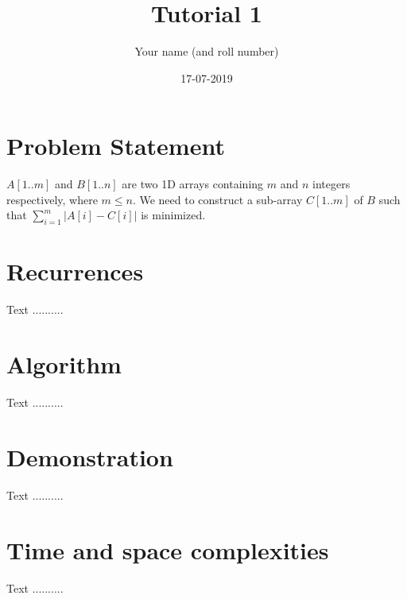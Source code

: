 \documentclass{article}
\title{Tutorial 1}
\date{17-07-2019}
\author{Your name (and roll number)}
\begin{document}
  \maketitle
  
  \section{Problem Statement}
    $A[1..m]$ and $B[1..n]$ are two 1D arrays containing $m$ and $n$ integers 
    respectively, where $m\le n$.
    We need to construct a sub-array $C[1..m]$ of $B$ such that 
    $\sum\limits_{i=1}^{m} \big|A[i]-C[i]\big|$ is minimized.
  
  \section{Recurrences}
  
    Text ..........
  
  \section{Algorithm}
  
    Text ..........
  
  \section{Demonstration}
  
    Text ..........
  
  \section{Time and space complexities}
  
    Text ..........
\end{document}
